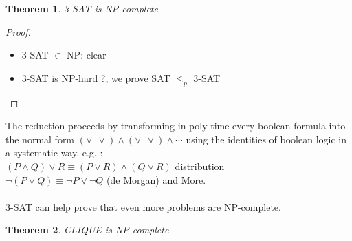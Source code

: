 \documentclass[11pt]{report}
\newtheorem{theorem}{Theorem}[section]
\theoremstyle{definition}
\theoremstyle{remark}
\begin{document}
\begin{theorem}
3-SAT is NP-complete
\end{theorem}

\begin{proof}
\begin{itemize}
\item 3-SAT $\in$ NP: clear
\item 3-SAT is NP-hard ?, we prove SAT $\leq_p$ 3-SAT
\end{itemize}
\end{proof}

The reduction proceeds by transforming in poly-time every boolean formula into the normal form $( \vee \ \ \vee ) \wedge ( \vee \ \ \vee) \wedge \cdots$ using the identities of boolean logic in a systematic way. e.g. : \\
$(P \wedge Q) \vee R \equiv (P \vee R) \wedge (Q \vee R)$ distribution \\
$ \neg (P \vee Q) \equiv \neg P \vee \neg Q$ (de Morgan) and More. 

\paragraph{}
3-SAT can help prove that even more problems are NP-complete. 


\begin{theorem}
CLIQUE is NP-complete
\end{theorem}
\end{document}
